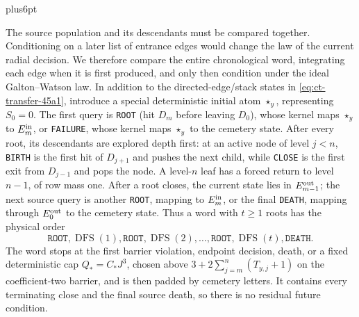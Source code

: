 \documentclass[12pt,reqno]{amsart}
\makeatletter
\theoremstyle{plain}
\theoremstyle{definition}
\theoremstyle{remark}
\renewenvironment{proof}[1][\proofname]{%
  \par
  \pushQED{\qed}%
  \normalfont
  \topsep6pt plus6pt\relax
  \trivlist
  \item[\hskip\labelsep\slshape #1\@addpunct{.}]%
  \ignorespaces
}{%
  \popQED
  \endtrivlist
  \@endpefalse
}
\DeclareRobustCommand{\qed}{%
  \leavevmode\unskip\penalty9999\hbox{}\nobreak
  \ifmmode
    \makebox[0pt][l]{\qquad\hbox{\qedsymbol}}%
  \else
    \qquad\hbox{\qedsymbol}%
  \fi
}
\renewcommand{\qedsymbol}{\rule[.47pt]{4pt}{6pt}}
\numberwithin{equation}{section}
\makeatother
\begin{document}
\begin{proof}[Proof of Lemma~\ref{lem:buffered-transfer}]
The source population and its descendants must be compared together.
Conditioning on a later list of entrance edges would change the law of the
current radial decision.  We therefore compare the entire chronological
word, integrating each edge when it is first produced, and only then
condition under the ideal Galton--Watson law.  In addition to
the directed-edge/stack states in \eqref{eq:ct-transfer-45a1}, introduce a special deterministic
initial atom $\star_y$, representing $S_0=0$.  The first query is
\texttt{ROOT} (hit $D_m$ before leaving $D_0$), whose kernel maps
$\star_y$ to $E_m^{\rm in}$, or \texttt{FAILURE}, whose kernel maps
$\star_y$ to the cemetery state.  After every root, its descendants are
explored depth first: at an active node of level $j<n$, \texttt{BIRTH} is the
first hit of $D_{j+1}$ and pushes the next child, while \texttt{CLOSE} is the
first exit from $D_{j-1}$ and pops the node.  A level-$n$ leaf has a
forced return to level $n-1$, of row mass one.  After a root closes, the
current state lies in $E_{m-1}^{\rm out}$; the next source query is
another \texttt{ROOT}, mapping to $E_m^{\rm in}$, or the final \texttt{DEATH}, mapping
through $E_0^{\rm out}$ to the cemetery state.  Thus a word with
$t\ge1$ roots has the
physical order
\begin{equation}
\mathtt{ROOT},\operatorname{DFS}(1),\mathtt{ROOT},
 \operatorname{DFS}(2),\ldots,\mathtt{ROOT},
 \operatorname{DFS}(t),\mathtt{DEATH}.\label{eq:ct-transfer-45f0}
\end{equation}
The word stops at the first barrier violation, endpoint decision, death,
or a fixed deterministic cap $Q_*=C_*J^3$, chosen above
$3+2\sum_{j=m}^n(T_{y,j}+1)$ on the coefficient-two barrier,
and is then padded by cemetery letters.  It contains every terminating
close and the final source death, so there is no residual future condition.


\end{proof}
\end{document}
